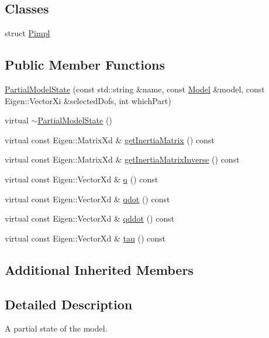 \subsection*{Classes}
\begin{DoxyCompactItemize}
\item 
struct \hyperlink{structocra_1_1PartialModelState_1_1Pimpl}{Pimpl}
\end{DoxyCompactItemize}
\subsection*{Public Member Functions}
\begin{DoxyCompactItemize}
\item 
\hyperlink{classocra_1_1PartialModelState_aad632d12d35f5982df12d949f92d4937}{Partial\+Model\+State} (const std\+::string \&name, const \hyperlink{classocra_1_1Model}{Model} \&model, const Eigen\+::\+Vector\+Xi \&selected\+Dofs, int which\+Part)
\item 
virtual \hyperlink{classocra_1_1PartialModelState_a59cf8faac5922dc7691c540d519fa705}{$\sim$\+Partial\+Model\+State} ()
\item 
virtual const Eigen\+::\+Matrix\+Xd \& \hyperlink{classocra_1_1PartialModelState_a0e43749ab50c307d4ee8dedddad5b338}{get\+Inertia\+Matrix} () const 
\item 
virtual const Eigen\+::\+Matrix\+Xd \& \hyperlink{classocra_1_1PartialModelState_aa428ce015f05c30b2a9e109b6f35f062}{get\+Inertia\+Matrix\+Inverse} () const 
\item 
virtual const Eigen\+::\+Vector\+Xd \& \hyperlink{classocra_1_1PartialModelState_ae68dca935841e04b53a72ce37a759ff7}{q} () const 
\item 
virtual const Eigen\+::\+Vector\+Xd \& \hyperlink{classocra_1_1PartialModelState_a72f80818595424416eb8e2144a7c3b98}{qdot} () const 
\item 
virtual const Eigen\+::\+Vector\+Xd \& \hyperlink{classocra_1_1PartialModelState_a00a5defefa657be427f422c2116a6dec}{qddot} () const 
\item 
virtual const Eigen\+::\+Vector\+Xd \& \hyperlink{classocra_1_1PartialModelState_aed089922827f25621d582e9163fd0315}{tau} () const 
\end{DoxyCompactItemize}
\subsection*{Additional Inherited Members}


\subsection{Detailed Description}
A partial state of the model. 

